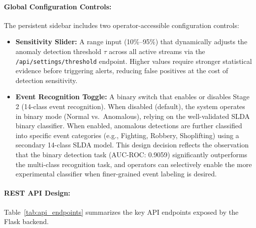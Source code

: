 \documentclass[12pt]{article}
\begin{document}
\paragraph{Global Configuration Controls:}
The persistent sidebar includes two operator-accessible configuration controls:
\begin{itemize}
    \item \textbf{Sensitivity Slider:} A range input (10\%--95\%) that dynamically adjusts the anomaly detection threshold $\tau$ across all active streams via the \texttt{/api/settings/threshold} endpoint. Higher values require stronger statistical evidence before triggering alerts, reducing false positives at the cost of detection sensitivity.
    
    \item \textbf{Event Recognition Toggle:} A binary switch that enables or disables Stage 2 (14-class event recognition). When disabled (default), the system operates in binary mode (Normal vs.\ Anomalous), relying on the well-validated SLDA binary classifier. When enabled, anomalous detections are further classified into specific event categories (e.g., Fighting, Robbery, Shoplifting) using a secondary 14-class SLDA model. This design decision reflects the observation that the binary detection task (AUC-ROC: 0.9059) significantly outperforms the multi-class recognition task, and operators can selectively enable the more experimental classifier when finer-grained event labeling is desired.
\end{itemize}

\paragraph{REST API Design:}
Table~\ref{tab:api_endpoints} summarizes the key API endpoints exposed by the Flask backend.
\end{document}
